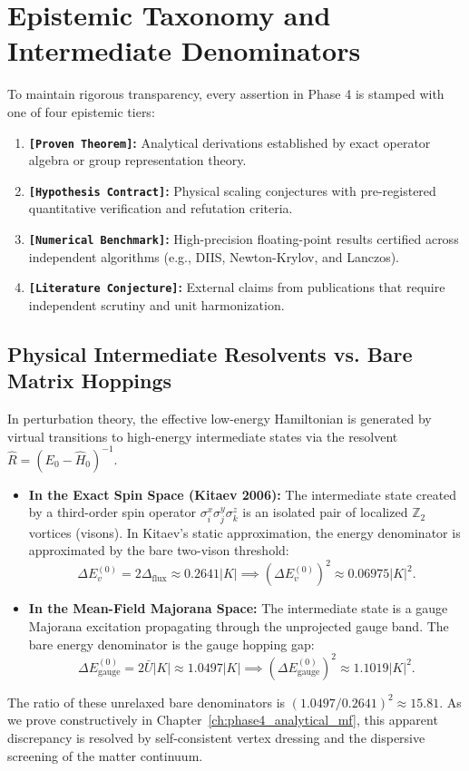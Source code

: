 \section{Epistemic Taxonomy and Intermediate Denominators}
\label{sec:phase4_epistemic}

To maintain rigorous transparency, every assertion in Phase 4 is stamped with one of four epistemic tiers:
\begin{enumerate}
    \item \textbf{\texttt{[Proven Theorem]}:} Analytical derivations established by exact operator algebra or group representation theory.
    \item \textbf{\texttt{[Hypothesis Contract]}:} Physical scaling conjectures with pre-registered quantitative verification and refutation criteria.
    \item \textbf{\texttt{[Numerical Benchmark]}:} High-precision floating-point results certified across independent algorithms (e.g., DIIS, Newton-Krylov, and Lanczos).
    \item \textbf{\texttt{[Literature Conjecture]}:} External claims from publications that require independent scrutiny and unit harmonization.
\end{enumerate}

\subsection{Physical Intermediate Resolvents vs. Bare Matrix Hoppings}
In perturbation theory, the effective low-energy Hamiltonian is generated by virtual transitions to high-energy intermediate states via the resolvent $\hat{R} = (E_0 - \hat{H}_0)^{-1}$. 
\begin{itemize}
    \item \textbf{In the Exact Spin Space (Kitaev 2006):} The intermediate state created by a third-order spin operator $\sigma_i^x \sigma_j^y \sigma_k^z$ is an isolated pair of localized $\mathbb{Z}_2$ vortices (visons). In Kitaev's static approximation, the energy denominator is approximated by the bare two-vison threshold:
    \begin{equation}
    \Delta E_v^{(0)} = 2 \Delta_{\mathrm{flux}} \approx 0.2641 |K| \implies (\Delta E_v^{(0)})^2 \approx 0.06975 |K|^2.
    \end{equation}
    \item \textbf{In the Mean-Field Majorana Space:} The intermediate state is a gauge Majorana excitation propagating through the unprojected gauge band. The bare energy denominator is the gauge hopping gap:
    \begin{equation}
    \Delta E_{\mathrm{gauge}}^{(0)} = 2 \bar{U} |K| \approx 1.0497 |K| \implies (\Delta E_{\mathrm{gauge}}^{(0)})^2 \approx 1.1019 |K|^2.
    \end{equation}
\end{itemize}
The ratio of these unrelaxed bare denominators is $(1.0497 / 0.2641)^2 \approx 15.81$. As we prove constructively in Chapter~\ref{ch:phase4_analytical_mf}, this apparent discrepancy is resolved by self-consistent vertex dressing and the dispersive screening of the matter continuum.
